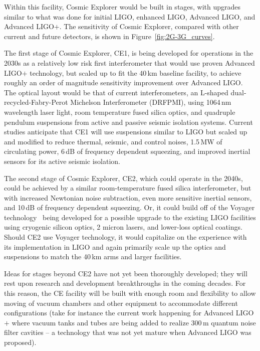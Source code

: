 \documentclass[graybox, nosecnum]{svmult}
\begin{document}
Within this facility, Cosmic Explorer would be built in stages, with upgrades similar to what was done for initial LIGO, enhanced LIGO, Advanced LIGO, and Advanced LIGO$+$. The sensitivity of Cosmic Explorer, compared with other current and future detectors, is shown in Figure~\ref{fig:2G-3G_curves}. 

The first stage of Cosmic Explorer, CE1, is being developed for operations in the 2030s as a relatively low risk first interferometer that would use proven Advanced LIGO$+$ technology, but scaled up to fit the 40\,km baseline facility, to achieve roughly an order of magnitude sensitivity improvement over Advanced LIGO. The optical layout would be that of current interferometers, an L-shaped dual-recycled-Fabry-Perot Michelson Interferometer (DRFPMI), using 1064\,nm wavelength laser light, room temperature fused silica optics, and quadruple pendulum suspensions from active and passive seismic isolation systems. Current studies
anticipate that CE1 will use suspensions similar to LIGO but scaled up and modified to reduce thermal, seismic, and control noises,
1.5\,MW of circulating power, 6\,dB of frequency dependent squeezing, and improved inertial sensors for its active seismic isolation. 

The second stage of Cosmic Explorer, CE2, which could operate in the 2040s, could be achieved by a similar room-temperature fused silica interferometer, but with increased Newtonian noise subtraction, even more sensitive inertial sensors, and 10\,dB of frequency dependent squeezing. Or, it could build off of the Voyager technology~\cite{Voyager2018} being developed for a possible upgrade to the existing LIGO facilities using cryogenic silicon optics, 2 micron lasers, and lower-loss optical coatings. Should CE2 use Voyager technology, it would capitalize on the experience with its implementation in LIGO and again primarily scale up the optics and suspensions to match the 40\,km arms and larger facilities. 

Ideas for stages beyond CE2 have not yet been thoroughly developed; they will rest upon research and development breakthroughs in the coming decades. For this reason, the CE facility will be built with enough room and flexibility to allow moving of vacuum chambers and other equipment to accommodate different configurations (take for instance the current work happening for Advanced LIGO$+$ where vacuum tanks and tubes are being added to realize 300\,m quantum noise filter cavities -- a technology that was not yet mature when Advanced LIGO was proposed).
\end{document}
